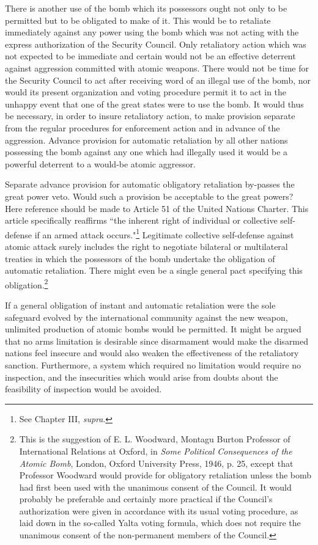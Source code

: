 There is another use of the bomb which its possessors ought not only to be permitted but to be obligated to make of it. This would be to retaliate immediately against any power using the bomb which was not acting with the express authorization of the Security Council. Only retaliatory action which was not expected to be immediate and certain would not be an effective deterrent against aggression committed with atomic weapons. There would not be time for the Security Council to act after receiving word of an illegal use of the bomb, nor would its present organization and voting procedure permit it to act in the unhappy event that one of the great states were to use the bomb. It would thus be necessary, in order to insure retaliatory action, to make provision separate from the regular procedures for enforcement action and in advance of the aggression. Advance provision for automatic retaliation by all other nations possessing the bomb against any one which had illegally used it would be a powerful deterrent to a would-be atomic aggressor.

Separate advance provision for automatic obligatory retaliation by-passes the great power veto. Would such a provision be acceptable to the great powers? Here reference should be made to Article 51 of the United Nations Charter. This article specifically reaffirms ``the inherent right of individual or collective self-defense if an armed attack occurs."\footnote{See Chapter III, \textit{supra}.} Legitimate collective self-defense
against atomic attack surely includes the right to negotiate bilateral or multilateral treaties in which the possessors of the bomb undertake the obligation of automatic retaliation. There might even be a single general pact specifying this obligation.\footnote{This is the suggestion of E. L. Woodward, Montagu Burton Professor of International Relations at Oxford, in \textit{Some Political Consequences of the Atomic Bomb}, London, Oxford University Press, 1946, p. 25, except that Professor Woodward would provide for obligatory retaliation unless the bomb had first been used with the unanimous consent of the Council. It would probably be preferable and certainly more practical if the Council's authorization were given in accordance with its usual voting procedure, as laid down in the so-called Yalta voting formula, which does not require the unanimous consent of the non-permanent members of the Council.}

If a general obligation of instant and automatic retaliation were the sole safeguard evolved by the international community against the new weapon, unlimited production of atomic bombs would be permitted. It might be argued that no arms limitation is desirable since disarmament would make the disarmed nations feel insecure and would also weaken the effectiveness of the retaliatory sanction. Furthermore, a system which required no limitation would require no inspection, and the insecurities which would arise from doubts about the feasibility of inspection would be avoided.

